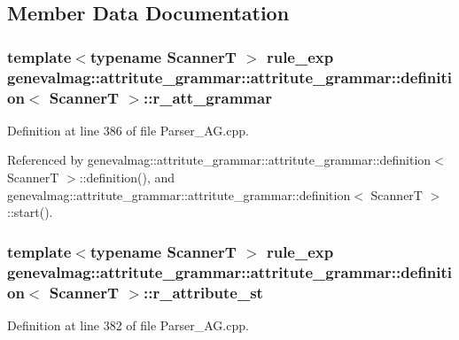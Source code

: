 \subsection{Member Data Documentation}
\hypertarget{structgenevalmag_1_1attritute__grammar_1_1definition_45a4f4243bf8c5d050f4bbb4c95a8646}{
\subsubsection[{r\_\-att\_\-grammar}]{\setlength{\rightskip}{0pt plus 5cm}template$<$typename ScannerT $>$ {\bf rule\_\-exp} genevalmag::attritute\_\-grammar::attritute\_\-grammar::definition$<$ ScannerT $>$::{\bf r\_\-att\_\-grammar}}}
\label{structgenevalmag_1_1attritute__grammar_1_1definition_45a4f4243bf8c5d050f4bbb4c95a8646}




Definition at line 386 of file Parser\_\-AG.cpp.

Referenced by genevalmag::attritute\_\-grammar::attritute\_\-grammar::definition$<$ ScannerT $>$::definition(), and genevalmag::attritute\_\-grammar::attritute\_\-grammar::definition$<$ ScannerT $>$::start().\hypertarget{structgenevalmag_1_1attritute__grammar_1_1definition_f655680f1e639b76853664321606910b}{
\subsubsection[{r\_\-attribute\_\-st}]{\setlength{\rightskip}{0pt plus 5cm}template$<$typename ScannerT $>$ {\bf rule\_\-exp} genevalmag::attritute\_\-grammar::attritute\_\-grammar::definition$<$ ScannerT $>$::{\bf r\_\-attribute\_\-st}}}
\label{structgenevalmag_1_1attritute__grammar_1_1definition_f655680f1e639b76853664321606910b}




Definition at line 382 of file Parser\_\-AG.cpp.

